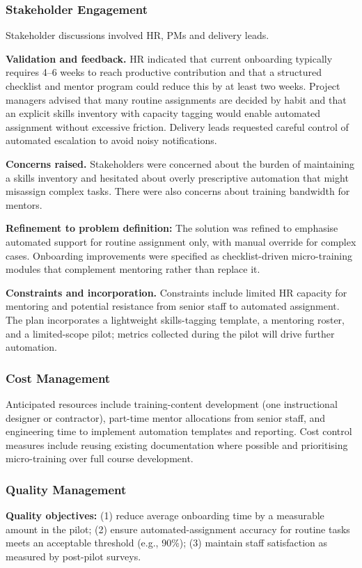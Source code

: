 \documentclass[12pt,a4paper]{report}
\begin{document}
\subsubsection{Stakeholder Engagement}
Stakeholder discussions involved HR, PMs and delivery leads.

\textbf{Validation and feedback.} HR indicated that current onboarding typically requires 4--6 weeks to reach productive contribution and that a structured checklist and mentor program could reduce this by at least two weeks. Project managers advised that many routine assignments are decided by habit and that an explicit skills inventory with capacity tagging would enable automated assignment without excessive friction. Delivery leads requested careful control of automated escalation to avoid noisy notifications.

\textbf{Concerns raised.} Stakeholders were concerned about the burden of maintaining a skills inventory and hesitated about overly prescriptive automation that might misassign complex tasks. There were also concerns about training bandwidth for mentors.

\begin{noteBox}
\textbf{Refinement to problem definition:} The solution was refined to emphasise automated support for routine assignment only, with manual override for complex cases. Onboarding improvements were specified as checklist-driven micro-training modules that complement mentoring rather than replace it.
\end{noteBox}

\textbf{Constraints and incorporation.} Constraints include limited HR capacity for mentoring and potential resistance from senior staff to automated assignment. The plan incorporates a lightweight skills-tagging template, a mentoring roster, and a limited-scope pilot; metrics collected during the pilot will drive further automation.

\subsubsection{Cost Management}
Anticipated resources include training-content development (one instructional designer or contractor), part-time mentor allocations from senior staff, and engineering time to implement automation templates and reporting. Cost control measures include reusing existing documentation where possible and prioritising micro-training over full course development.

\subsubsection{Quality Management}
\begin{summaryBox}
\textbf{Quality objectives:} (1) reduce average onboarding time by a measurable amount in the pilot; (2) ensure automated-assignment accuracy for routine tasks meets an acceptable threshold (e.g., 90\%); (3) maintain staff satisfaction as measured by post-pilot surveys.
\end{summaryBox}
\end{document}
